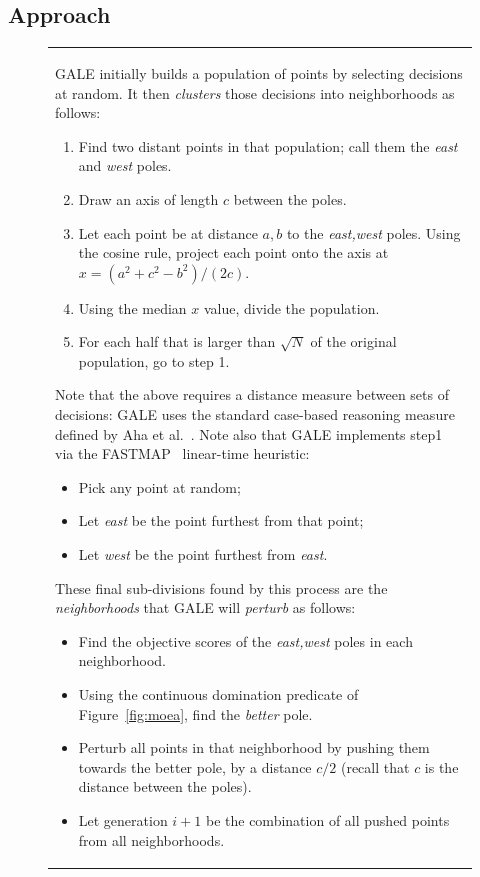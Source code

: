\documentclass{sig-alternative}
\newcommand{\fig}[1]{Figure~\ref{fig:#1}}
\begin{document}
\subsection{Approach}
\begin{figure}[!b]
\small
\begin{tabular}{|p{.95\linewidth}|}\hline
GALE initially builds a population of points by selecting decisions at random. It then {\em clusters} those decisions into neighborhoods as follows:
\begin{enumerate}
\item Find two distant points in that population; call them the {\em east} and {\em west} poles. 
\item Draw an axis of length $c$ between the poles. 
\item Let each point be at distance $a,b$ to the {\em east,west} poles.  Using the cosine rule, project each point onto the  axis  at $x=(a^2 + c^2 - b^2)/(2c)$.  
\item Using the median $x$ value, divide the population.
\item For each half that is larger than $\sqrt{N}$ of the original population, go to step 1.
\end{enumerate}

Note that the above requires a distance measure between sets of decisions: GALE uses the standard case-based reasoning measure defined by Aha et al.~\cite{aha91}. Note also that GALE implements step1 via  the FASTMAP~\cite{Faloutsos1995} linear-time
heuristic:
\begin{itemize}
\item Pick any point at random; 
\item Let {\em east} be the point furthest from that point; 
\item Let {\em west} be the point furthest from {\em east}.
\end{itemize}

These final sub-divisions found by this process are the {\em neighborhoods} that GALE will {\em perturb} as follows:
\begin{itemize}
\item Find the objective scores of the {\em east,west} poles in each neighborhood.
\item Using the continuous domination predicate of \fig{moea}, find  the {\em better} pole. 
\item Perturb all points in that neighborhood by pushing them towards the better pole, by a distance  $c/2$ (recall that  $c$ is the distance between the poles).
\item Let generation $i+1$ be the combination of all pushed points from all neighborhoods.
\end{itemize}


\end{tabular}
\end{figure}
\end{document}
